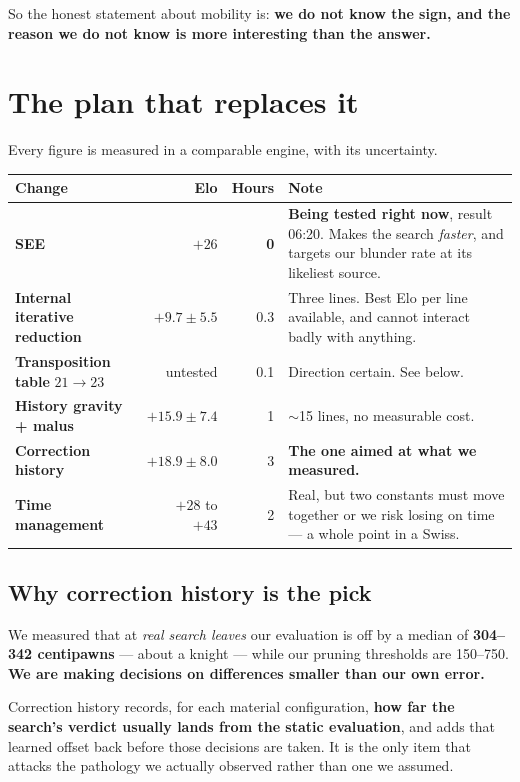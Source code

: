 \documentclass[11pt,a4paper]{article}
\newcommand{\good}[1]{\textcolor{teal!70!black}{\textbf{#1}}}
\begin{document}
So the honest statement about mobility is: \textbf{we do not know the sign, and the reason we do
not know is more interesting than the answer.}

\section{The plan that replaces it}

Every figure is measured in a comparable engine, with its uncertainty.

\begin{center}
\begin{longtable}{p{4.3cm}rrp{5.6cm}}
\toprule
Change & Elo & Hours & Note \\
\midrule\endhead
\textbf{SEE} & $+26$ & \good{0} & \textbf{Being tested right now}, result 06:20. Makes the search
\emph{faster}, and targets our blunder rate at its likeliest source. \\
\addlinespace
\textbf{Internal iterative reduction} & $+9.7 \pm 5.5$ & 0.3 & Three lines. Best Elo per line
available, and cannot interact badly with anything. \\
\addlinespace
\textbf{Transposition table} $21\!\to\!23$ & untested & 0.1 & Direction certain. See below. \\
\addlinespace
\textbf{History gravity + malus} & $+15.9 \pm 7.4$ & 1 & $\sim$15 lines, no measurable cost. \\
\addlinespace
\textbf{Correction history} & $+18.9 \pm 8.0$ & 3 & \textbf{The one aimed at what we measured.} \\
\addlinespace
\textbf{Time management} & $+28$ to $+43$ & 2 & Real, but two constants must move together or we
risk losing on time --- a whole point in a Swiss. \\
\bottomrule
\end{longtable}
\end{center}

\subsection{Why correction history is the pick}

We measured that at \emph{real search leaves} our evaluation is off by a median of \textbf{304--342
centipawns} --- about a knight --- while our pruning thresholds are 150--750. \textbf{We are making
decisions on differences smaller than our own error.}

Correction history records, for each material configuration, \textbf{how far the search's verdict
usually lands from the static evaluation}, and adds that learned offset back before those
decisions are taken. It is the only item that attacks the pathology we actually observed rather
than one we assumed.
\end{document}
